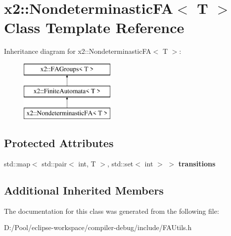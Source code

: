 \hypertarget{classx2_1_1_nondeterminastic_f_a}{}\section{x2\+:\+:Nondeterminastic\+FA$<$ T $>$ Class Template Reference}
\label{classx2_1_1_nondeterminastic_f_a}
Inheritance diagram for x2\+:\+:Nondeterminastic\+FA$<$ T $>$\+:\begin{figure}[H]
\begin{center}
\leavevmode
\includegraphics[height=3.000000cm]{classx2_1_1_nondeterminastic_f_a}
\end{center}
\end{figure}
\subsection*{Protected Attributes}
\begin{DoxyCompactItemize}
\item 
\mbox{\label{classx2_1_1_nondeterminastic_f_a_a4e08a188366e00391a3dc3e9b20ee473}} 
std\+::map$<$ std\+::pair$<$ int, T $>$, std\+::set$<$ int $>$ $>$ {\bfseries transitions}
\end{DoxyCompactItemize}
\subsection*{Additional Inherited Members}


The documentation for this class was generated from the following file\+:\begin{DoxyCompactItemize}
\item 
D\+:/\+Pool/eclipse-\/workspace/compiler-\/debug/include/F\+A\+Utils.\+h\end{DoxyCompactItemize}
